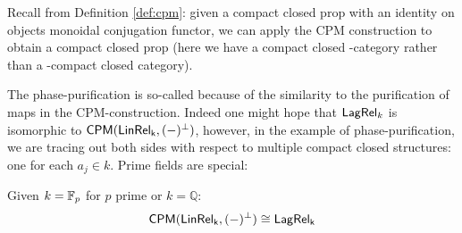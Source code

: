 %
Recall from Definition \ref{def:cpm}:  given a compact closed prop with an identity on objects monoidal conjugation functor, we can apply the CPM construction to obtain a compact closed prop (here we have a compact closed \dag-category rather than a \dag-compact closed category).

The phase-purification is so-called because of the similarity to the purification of maps in the CPM-construction.  Indeed one might hope that $\mathsf{Lag}\mathsf{Rel}_k$ is isomorphic to $\mathsf{CPM}(\sf LinRel_k,(-)^\perp)$, however, in the example of phase-purification, we are tracing out both sides with respect to multiple compact closed structures:  one for each $a_j \in k$.  Prime fields are special:
\begin{corollary}
\label{cor}
\label{cor:cpm}
Given $k=\mathbb{F}_p$ for $p$ prime or $k=\mathbb{Q}$:
$$\mathsf{CPM}(\sf LinRel_{k}, (-)^\perp) \cong \mathsf{Lag}\mathsf{Rel}_k$$
\end{corollary}
